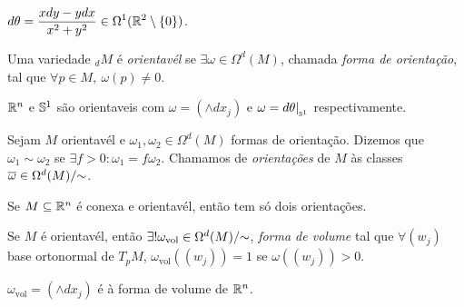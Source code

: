 \begin{example}
    \(\displaystyle d\theta = \frac{x dy - ydx }{x^2+ y^2} \in \Omega^1(\mathbb{R}^2\setminus\{0\})\). 
\end{example}


\begin{definition}
    Uma variedade \(_dM\) é \emph{orientavél} se \(\exists \omega \in \Omega^d(M)\), chamada \emph{forma de orientação}, tal que \(\forall p \in M, \ \omega(p)\neq 0 \). 
\end{definition}

\begin{example}
    \(\mathbb{R}^n\) e \(\mathbb{S}^1\) são orientaveis com \(\omega = (\wedge dx_j) \) e \(\omega = d\theta|_{_{\mathbb{S}^1}}\) respectivamente. %
\end{example}
     
\begin{definition}
    Sejam \(M\) orientavél e \(\omega_1, \omega_2 \in \Omega^d(M)\) formas de orientação.  Dizemos que \(\omega_1 \sim \omega_2\) se \(\exists f>0: \omega_1 = f \omega_2\). Chamamos de \emph{orientações} de \(M\) às classes  \(\overline{\omega} \in \Omega^d(M)/\hspace{-0.1cm}\sim\). 
\end{definition}

\begin{exercise}
    Se \(M\subseteq \mathbb{R}^n\) é conexa e orientavél, então tem só dois orientações. %
\end{exercise}

\begin{definition}
    Se \(M\) é orientavél, então \(\exists !\omega_\text{vol}\in \Omega^d(M)/\hspace{-0.1cm}\sim\), \emph{forma de volume} tal que \(\forall (w_j)\) base ortonormal de \(T_pM\), \(\omega_\text{vol}((w_j))=1 \) se \(\omega((w_j)) > 0\). 
\end{definition}

\begin{example}
    \(\omega_\text{vol} = (\wedge dx_j) \) é à forma de volume de \(\mathbb{R}^n\). 
\end{example}


